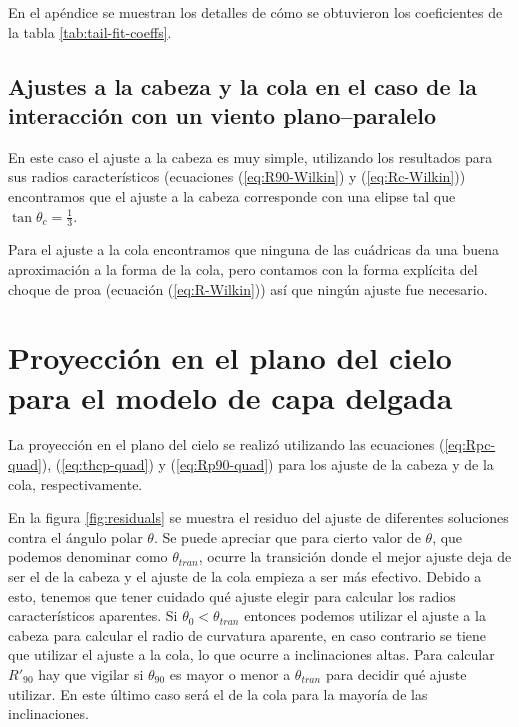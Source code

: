  
 En el apéndice  se muestran los detalles de cómo se obtuvieron los coeficientes de la tabla \ref{tab:tail-fit-coeffs}.
 
 \subsection{Ajustes a la cabeza y la cola en el caso de la interacción con un viento plano--paralelo}

 En este caso el ajuste a la cabeza es muy simple, utilizando los resultados para sus radios característicos
 (ecuaciones (\ref{eq:R90-Wilkin}) y (\ref{eq:Rc-Wilkin})) encontramos que el ajuste a la cabeza corresponde
 con una elipse tal que $\tan\theta_c = \frac{1}{3}$.

 Para el ajuste a la cola encontramos que ninguna de las cuádricas da una buena aproximación a la forma de la
 cola, pero contamos con la forma explícita del choque de proa (ecuación (\ref{eq:R-Wilkin})) así que ningún
 ajuste fue necesario.
 
 \section{Proyección en el plano del cielo para el modelo de capa delgada}

 La proyección en el plano del cielo se realizó utilizando las ecuaciones (\ref{eq:Rpc-quad}), (\ref{eq:thcp-quad})
 y (\ref{eq:Rp90-quad}) para los ajuste de la cabeza y de la cola, respectivamente.

 En la figura \ref{fig:residuals} se muestra el residuo del ajuste de diferentes soluciones contra el ángulo polar
 $\theta$. Se puede apreciar que para cierto valor de $\theta$, que podemos denominar como $\theta_{tran}$, ocurre
 la transición donde el mejor ajuste deja de ser el de la cabeza y el ajuste de la cola empieza a ser más efectivo.
 Debido a esto, tenemos que tener cuidado qué ajuste elegir para calcular los radios característicos aparentes. Si
 $\theta_0 < \theta_{tran}$ entonces podemos utilizar el ajuste a la cabeza para calcular el radio de curvatura
 aparente, en caso contrario se tiene que utilizar el ajuste a la cola, lo que ocurre a inclinaciones altas.
 Para calcular $R'_{90}$ hay que vigilar si $\theta_{90}$ es mayor o menor a $\theta_{tran}$ para decidir qué ajuste
 utilizar. En este último caso será el de la cola para la mayoría de las inclinaciones.

